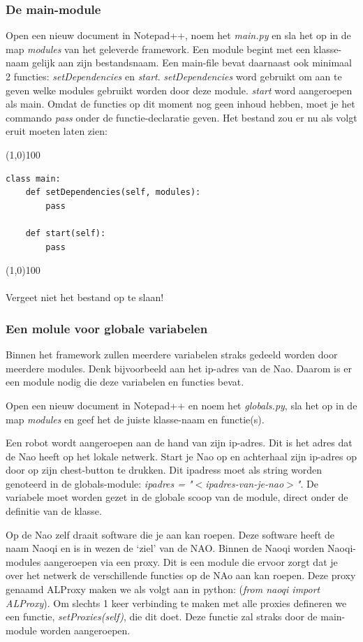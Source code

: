 \documentclass[a4paper, twoside]{article}
\begin{document}
\subsubsection{De main-module}
Open een nieuw document in Notepad++, noem het \textit{main.py} en sla het op in de map \textit{modules} van het geleverde framework. 
Een module begint met een klasse-naam gelijk aan zijn bestandsnaam. Een main-file bevat daarnaast ook minimaal 2 functies: \textit{setDependencies} en \textit{start}. \textit{setDependencies} word gebruikt om aan te geven welke modules gebruikt worden door deze module. \textit{start} word aangeroepen als main.
Omdat de functies op dit moment nog geen inhoud hebben, moet je het commando \textit{pass} onder de functie-declaratie geven. Het bestand zou er nu als volgt eruit moeten laten zien:

\noindent \line(1,0){100}
\begin{verbatim}
class main:
    def setDependencies(self, modules):
        pass

    def start(self):
        pass
\end{verbatim}
\noindent \line(1,0){100}
\\\\
Vergeet niet het bestand op te slaan!

\subsubsection{Een molule voor globale variabelen}
Binnen het framework zullen meerdere variabelen straks gedeeld worden door meerdere modules. Denk bijvoorbeeld aan het ip-adres van de Nao. Daarom is er een module nodig die deze variabelen en functies bevat.

Open een nieuw document in Notepad++ en noem het \textit{globals.py}, sla het op in de map \textit{modules} en geef het de juiste klasse-naam en functie(s). 

Een robot wordt aangeroepen aan de hand van zijn ip-adres. Dit is het adres dat de Nao heeft op het lokale netwerk. Start je Nao op en achterhaal zijn ip-adres op door op zijn chest-button te drukken. Dit ipadress moet als string worden genoteerd in de globals-module: \textit{ ipadres = "$<$ipadres-van-je-nao$>$"}. De variabele moet worden gezet in de globale scoop van de module, direct onder de definitie van de klasse.

Op de Nao zelf draait software die je aan kan roepen. Deze software heeft de naam Naoqi en is in wezen de `ziel' van de NAO.
Binnen de Naoqi worden Naoqi-modules aangeroepen via een proxy. Dit is een module die ervoor zorgt dat je over het netwerk de verschillende functies op de NAo aan kan roepen. Deze proxy genaamd ALProxy maken we als volgt aan in python: (\textit{from naoqi import ALProxy}). Om slechts 1 keer verbinding te maken met alle proxies defineren we een functie, \textit{setProxies(self)}, die dit doet. Deze functie zal straks door de main-module worden aangeroepen.
\end{document}
